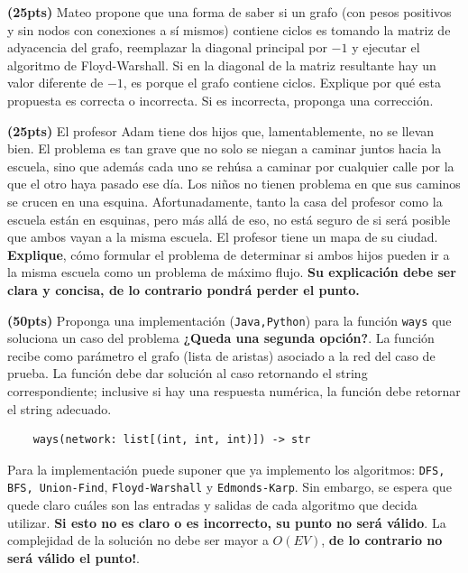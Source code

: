 \documentclass[12pt, a4paper]{exam}
\begin{document}
\begin{questions}
	\pointsdroppedatright

	\question \textbf{(25pts)} Mateo propone que una forma de saber si un grafo (con pesos
	positivos y sin nodos con conexiones a sí mismos) contiene ciclos es tomando la matriz
	de adyacencia del grafo, reemplazar la diagonal principal por $-1$ y ejecutar el
	algoritmo de Floyd-Warshall. Si en la diagonal de la matriz resultante hay un valor
	diferente de $-1$, es porque el grafo contiene ciclos. Explique por qué esta propuesta
	es correcta o incorrecta. Si es incorrecta, proponga una corrección.

	\question \textbf{(25pts)} El profesor Adam tiene dos hijos que, lamentablemente, no
	se llevan bien. El problema es tan grave que no solo se niegan a caminar juntos hacia
	la escuela, sino que además cada uno se rehúsa a caminar por cualquier calle por la
	que el otro haya pasado ese día. Los niños no tienen problema en que sus caminos se
	crucen en una esquina. Afortunadamente, tanto la casa del profesor como la escuela
	están en esquinas, pero más allá de eso, no está seguro de si será posible que ambos
	vayan a la misma escuela.  El profesor tiene un mapa de su ciudad. \textbf{Explique},
	cómo formular el problema de determinar si ambos hijos pueden ir a la misma escuela
	como un problema de máximo flujo.
	\textbf{Su explicación debe ser clara y concisa, de lo contrario pondrá perder el punto.}



	\question \textbf{(50pts)} Proponga una implementación (\verb|Java,Python|) para la
	función \verb|ways| que soluciona un caso del problema \textbf{¿Queda una segunda
	opción?}. La función recibe como parámetro el grafo (lista de aristas) asociado a la
	red del caso de prueba. La función debe dar solución al caso retornando el string
	correspondiente; inclusive si hay una respuesta numérica, la función debe retornar el
	string adecuado.

	\begin{lstlisting}
	ways(network: list[(int, int, int)]) -> str
	\end{lstlisting}

	Para la implementación puede suponer que ya implemento los algoritmos: \verb|DFS, BFS, Union-Find|, \verb|Floyd-Warshall| y \verb|Edmonds-Karp|. Sin embargo, se espera que
	quede claro cuáles son las entradas y salidas de cada algoritmo que decida utilizar.
	\textbf{Si esto no es claro o es incorrecto, su punto no será válido}. La complejidad
	de la solución no debe ser mayor a $O(EV)$, \textbf{de lo contrario no será válido el
	punto!}.

	
	

\end{questions}

\end{document}
